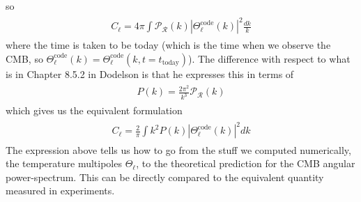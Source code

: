 so
{\small\begin{align}
\begin{aligned}
    C_{\ell}=4\pi \int \mathcal{P}_{\mathcal{R}}(k)|\Theta_{\ell}^{\mathrm{code}}(k)|^{2}\frac{dk}{k}
\end{aligned}
\end{align}}
where the time is taken to be today (which is the time when we observe the CMB, so $\Theta_{\ell}^{\mathrm{code}}(k)=\Theta_{\ell}^{\mathrm{code}}(k, t=t_{\mathrm{today}})$).
The difference with respect to what is in Chapter 8.5.2 in Dodelson is that he expresses this in terms of
{\small\begin{align}
\begin{aligned}
    P(k)=\frac{2\pi^{2}}{k^{3}}\mathcal{P}_{\mathcal{R}}(k)
\end{aligned}
\end{align}}
which gives us the equivalent formulation
{\small\begin{align}
\begin{aligned}
    C_{\ell}=\frac{2}{\pi}\int k^{2}P(k)|\Theta_{\ell}^{\mathrm{code}}(k)|^{2}dk
\end{aligned}
\end{align}}
The expression above tells us how to go from the stuff we computed numerically, the temperature multipoles $\Theta_{\ell}$, to the theoretical prediction for the CMB angular power-spectrum.
This can be directly compared to the equivalent quantity measured in experiments.